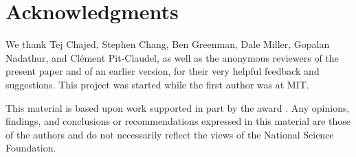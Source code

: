 \documentclass[acmsmall,screen]{acmart}
\begin{document}


\maketitle

{
  \setlength{\parskip}{3pt}
  \renewcommand{\labelitemi}{\textendash}

  \identDialog{}


  

  
  
  
  
  
  
  
  
  

  

  
  
  
  
  

  

  

  \identNormal{}

  \section*{Acknowledgments}
  We thank Tej Chajed, Stephen Chang, Ben Greenman, Dale Miller, Gopalan Nadathur, and Cl{\'e}ment Pit-Claudel, as well as the anonymous reviewers of the present paper and of an earlier version, for their very helpful
  feedback and suggestions. This project was started while the first author was at MIT.

  This material is based upon work supported in part by the  award
  .  Any opinions, findings, and conclusions or
  recommendations expressed in this material are those of the authors
  and do not necessarily reflect the views of the National Science
  Foundation.

}


\end{document}
